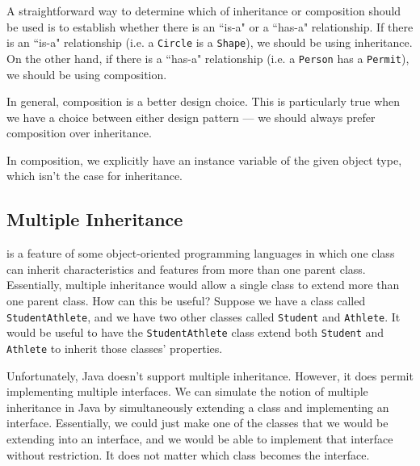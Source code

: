 A straightforward way to determine which of inheritance or composition should be used is to establish whether there is an ``is-a" or a ``has-a" relationship. If there is an ``is-a" relationship (i.e. a \verb!Circle! is a \verb!Shape!), we should be using inheritance. On the other hand, if there is a ``has-a" relationship (i.e. a \verb!Person! has a \verb!Permit!), we should be using composition. 


In general, composition is a better design choice. This is particularly true when we have a choice between either design pattern --- we should always prefer composition over inheritance. 

In composition, we explicitly have an instance variable of the given object type, which isn't the case for inheritance. 

\subsection{Multiple Inheritance}

 is a feature of some object-oriented programming languages in which one class can inherit characteristics and features from more than one parent class. Essentially, multiple inheritance would allow a single class to extend more than one parent class. 
How can this be useful? Suppose we have a class called \verb!StudentAthlete!, and we have two other classes called \verb!Student! and \verb!Athlete!. It would be useful to have the \verb!StudentAthlete! class extend both \verb!Student! and \verb!Athlete! to inherit those classes' properties. 

Unfortunately, Java doesn't support multiple inheritance. However, it does permit implementing multiple interfaces. We can simulate the notion of multiple inheritance in Java by simultaneously extending a class and implementing an interface. Essentially, we could just make one of the classes that we would be extending into an interface, and we would be able to implement that interface without restriction. It does not matter which class becomes the interface.%